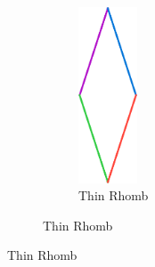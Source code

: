 \documentclass[
  oneside,
  11pt, a4paper,
  footinclude=true,
  headinclude=true,
  cleardoublepage=empty
]{scrbook}
\begin{document}
\begin{figure}[H]
\begin{subfigure}[b]{\textwidth}
\begin{subfigure}[b]{0.5\textwidth}
\includegraphics[width=0.25\textwidth]{ColouredSkinnyRhomb}
\caption{Thin Rhomb}
\end{subfigure}

\end{subfigure}


\end{figure}
\end{document}
